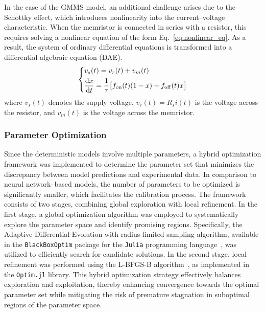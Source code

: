 \documentclass[lettersize,journal]{IEEEtran}
\newcommand{\dert}[1]{\frac{{\rm d} {#1}}{{\rm d} t} }
\begin{document}
In the case of the GMMS model, an additional challenge arises due to the Schottky effect, which introduces nonlinearity into the current–voltage characteristic. When the memristor is connected in series with a resistor, this requires solving a nonlinear equation of the form Eq.~\eqref{eq:nonlinear_eq}. As a result, the system of ordinary differential equations is transformed into a differential-algebraic equation (DAE).
\begin{equation}
  \left\{
  \begin{aligned}
     & v_s(t)    = v_r(t) + v_m(t)                                                   \\
     & \dert{x}  = \frac{1}{\tau} \big[ f_{\rm on}(t) (1-x) - f_{\rm off}(t) x \big]
  \end{aligned}
  \right.
  \label{eq:nonlinear_eq}
\end{equation}
where \(v_s(t)\) denotes the supply voltage, \(v_r(t) = R_s i(t)\) is the voltage across the resistor, and \(v_m(t)\) is the voltage across the memristor.

\subsubsection{Parameter Optimization}
Since the deterministic models involve multiple parameters, a hybrid optimization framework was implemented to determine the parameter set that minimizes the discrepancy between model predictions and experimental data. In comparison to neural network--based models, the number of parameters to be optimized is significantly smaller, which facilitates the calibration process. The framework consists of two stages, combining global exploration with local refinement. In the first stage, a global optimization algorithm was employed to systematically explore the parameter space and identify promising regions. Specifically, the Adaptive Differential Evolution with radius-limited sampling algorithm, available in the \verb|BlackBoxOptim| package for the \texttt{Julia} programming language~\cite{BlackBoxOptim}, was utilized to efficiently search for candidate solutions. In the second stage, local refinement was performed using the L-BFGS-B algorithm~\cite{Zhu1997}, as implemented in the \texttt{Optim.jl} library. This hybrid optimization strategy effectively balances exploration and exploitation, thereby enhancing convergence towards the optimal parameter set while mitigating the risk of premature stagnation in suboptimal regions of the parameter space.
\end{document}
